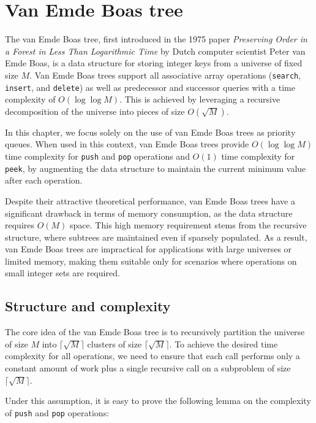 \section{Van Emde Boas tree}

The van Emde Boas tree, first introduced in the 1975 paper \emph{Preserving Order in a Forest in Less Than Logarithmic Time} \cite{vanEmdeBoas1975} by Dutch computer scientist Peter van Emde Boas, is a data structure for storing integer keys from a universe of fixed size \( M \). Van Emde Boas trees support all associative array operations (\texttt{search}, \texttt{insert}, and \texttt{delete}) as well as predecessor and successor queries with a time complexity of \( O(\log \log M) \). This is achieved by leveraging a recursive decomposition of the universe into pieces of size \( O(\sqrt{M}) \). 

In this chapter, we focus solely on the use of van Emde Boas trees as priority queues. When used in this context, van Emde Boas trees provide \( O(\log \log M) \) time complexity for \texttt{push} and \texttt{pop} operations and \( O(1) \) time complexity for \texttt{peek}, by augmenting the data structure to maintain the current minimum value after each operation.

Despite their attractive theoretical performance, van Emde Boas trees have a significant drawback in terms of memory consumption, as the data structure requires \( O(M) \) space. This high memory requirement stems from the recursive structure, where subtrees are maintained even if sparsely populated. As a result, van Emde Boas trees are impractical for applications with large universes or limited memory, making them suitable only for scenarios where operations on small integer sets are required.

\subsection{Structure and complexity}

The core idea of the van Emde Boas tree is to recursively partition the universe of size \( M \) into \( \lceil \sqrt{M} \rceil \) clusters of size \( \lceil \sqrt{M} \rceil \). To achieve the desired time complexity for all operations, we need to ensure that each call performs only a constant amount of work plus a single recursive call on a subproblem of size \( \lceil \sqrt{M} \rceil \). 

Under this assumption, it is easy to prove the following lemma on the complexity of \texttt{push} and \texttt{pop} operations:


